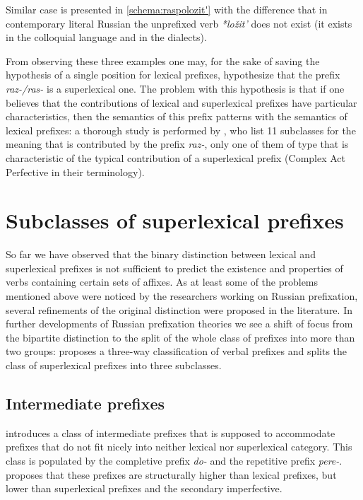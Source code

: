 Similar case is presented in \ref{schema:raspolozit'}
with the difference that in contemporary literal Russian the unprefixed verb \textit{*lo\v{z}it'\textsuperscript{\IPF}} does not exist (it exists in the colloquial language and in the dialects). 

From observing these three examples one may, for the sake of saving the hypothesis of a single position for lexical prefixes, hypothesize that the prefix \textit{raz-/ras-} is a superlexical one. The problem with this hypothesis is that if one believes that the contributions of lexical and superlexical prefixes have particular characteristics, then the semantics of this prefix patterns with the semantics of lexical prefixes: a thorough study is performed by \citet{JandaNesset:10}, who list 11 subclasses for the meaning that is contributed by the prefix \textit{raz-}, only one of them of  type that is characteristic of the typical contribution of a superlexical prefix (Complex Act Perfective in their terminology).


\section{Subclasses of superlexical prefixes}\label{section:subclasses}
So far we have observed that the binary distinction between lexical and superlexical prefixes is not sufficient to predict the existence and properties of verbs containing certain sets of affixes. As at least some of the problems mentioned above were noticed by the researchers working on Russian prefixation, several refinements of the original distinction were proposed in the literature. In further developments of Russian prefixation theories we see a shift of focus from the bipartite distinction to the split of the whole class of prefixes into more than two groups: \citet{Tatevosov:07} proposes a three-way classification of verbal prefixes and \citet{Tatevosov:09} splits the class of superlexical prefixes into three subclasses.

\subsection{Intermediate prefixes}
\cite{Tatevosov:07} introduces a class of intermediate prefixes that is supposed to accommodate prefixes that do not fit nicely into neither lexical nor superlexical category. This class is populated by the completive prefix \textit{do-} and the repetitive prefix \textit{pere-}. \citet{Tatevosov:07} proposes that these prefixes are structurally higher than lexical prefixes, but lower than superlexical prefixes and the secondary imperfective. 

